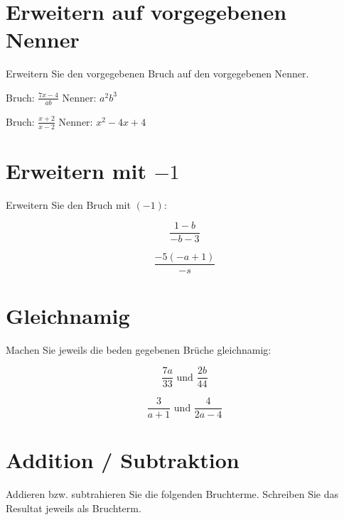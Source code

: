 \section{Erweitern auf vorgegebenen Nenner}
Erweitern Sie den vorgegebenen Bruch auf den vorgegebenen Nenner.

\begin{bbwAufgabenBlock}
\item
Bruch: $\frac{7x-4}{ab}$  Nenner: $a^2b^3$


\item
Bruch: $\frac{x+2}{x-2}$  Nenner: $x^2-4x+4$

\end{bbwAufgabenBlock}
\section{Erweitern mit $-1$}
Erweitern Sie den Bruch mit $(-1)$:

\begin{bbwAufgabenBlock}
\item $$\frac{1-b}{-b-3}$$


\item $$\frac{-5(-a+1)}{-s}$$
\end{bbwAufgabenBlock}
\section{Gleichnamig}
Machen Sie jeweils die beden gegebenen Brüche gleichnamig:

\begin{bbwAufgabenBlock}
\item $$\frac{7a}{33} \text{ und } \frac{2b}{44}$$

\item $$\frac{3}{a+1} \text{ und } \frac{4}{2a-4}$$

\end{bbwAufgabenBlock}
\newpage
\section{Addition / Subtraktion}\label{bruchtermeAdditionSubtraktion}
Addieren bzw. subtrahieren Sie die folgenden Bruchterme. Schreiben Sie
das Resultat jeweils als Bruchterm.


